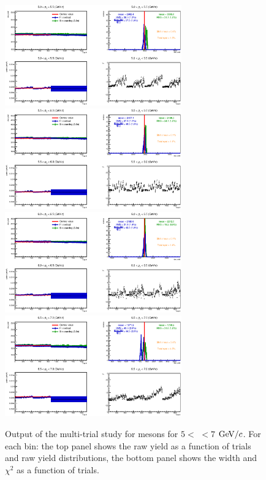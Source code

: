\begin{figure}[!h]
\begin{center}
\includegraphics[width=0.68\textwidth]{figures/Dstar/pp13TeV/multi_trial/MultiFit_bkg5_5-5.eps}
\includegraphics[width=0.68\textwidth]{figures/Dstar/pp13TeV/multi_trial/MultiFit_bkg5_5-6.eps}
\includegraphics[width=0.68\textwidth]{figures/Dstar/pp13TeV/multi_trial/MultiFit_bkg5_6-6.eps}
\includegraphics[width=0.68\textwidth]{figures/Dstar/pp13TeV/multi_trial/MultiFit_bkg5_6-7.eps}
\caption{Output of the multi-trial study for \Dstar mesons for $5<$ \pt$<7$ ${\rm GeV}/c$. For each \pt bin: the top panel shows the raw yield as a function of trials and raw yield distributions, the bottom panel shows the width and $\chi^2$ as a function of trials.}
\label{fig:DstarYieldSyst010_3}
\end{center}
\end{figure}


